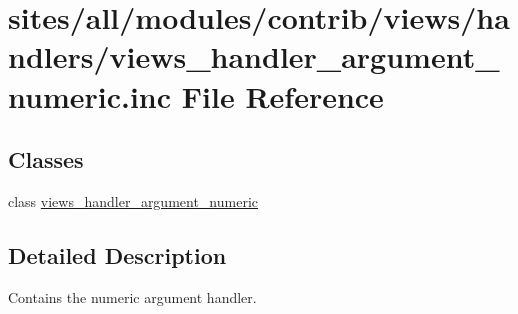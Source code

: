 \hypertarget{views__handler__argument__numeric_8inc}{
\section{sites/all/modules/contrib/views/handlers/views\_\-handler\_\-argument\_\-numeric.inc File Reference}
\label{views__handler__argument__numeric_8inc}
}
\subsection*{Classes}
\begin{CompactItemize}
\item 
class \hyperlink{classviews__handler__argument__numeric}{views\_\-handler\_\-argument\_\-numeric}
\end{CompactItemize}


\subsection{Detailed Description}
Contains the numeric argument handler. 